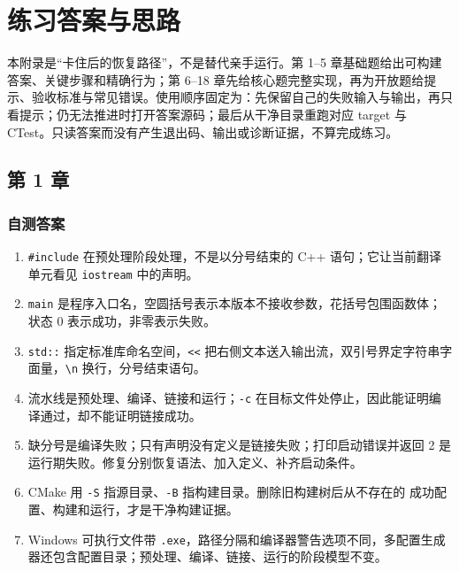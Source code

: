 \chapter{练习答案与思路}

本附录是“卡住后的恢复路径”，不是替代亲手运行。第 1--5 章基础题给出可构建答案、关键步骤和精确行为；第 6--18 章先给核心题完整实现，再为开放题给提示、验收标准与常见错误。使用顺序固定为：先保留自己的失败输入与输出，再只看提示；仍无法推进时打开答案源码；最后从干净目录重跑对应 target 与 CTest。只读答案而没有产生退出码、输出或诊断证据，不算完成练习。

\section{第 1 章}
\subsection*{自测答案}
\begin{enumerate}
  \item \texttt{\#include} 在预处理阶段处理，不是以分号结束的 C++ 语句；它让当前翻译单元看见 \texttt{iostream} 中的声明。
  \item \texttt{main} 是程序入口名，空圆括号表示本版本不接收参数，花括号包围函数体；状态 0 表示成功，非零表示失败。
  \item \texttt{std::} 指定标准库命名空间，\texttt{<<} 把右侧文本送入输出流，双引号界定字符串字面量，\texttt{\textbackslash n} 换行，分号结束语句。
  \item 流水线是预处理、编译、链接和运行；\texttt{-c} 在目标文件处停止，因此能证明编译通过，却不能证明链接成功。
  \item 缺分号是编译失败；只有声明没有定义是链接失败；打印启动错误并返回 2 是运行期失败。修复分别恢复语法、加入定义、补齐启动条件。
  \item CMake 用 \texttt{-S} 指源目录、\texttt{-B} 指构建目录。删除旧构建树后从不存在的  成功配置、构建和运行，才是干净构建证据。
  \item Windows 可执行文件带 \texttt{.exe}，路径分隔和编译器警告选项不同，多配置生成器还包含配置目录；预处理、编译、链接、运行的阶段模型不变。
\end{enumerate}


